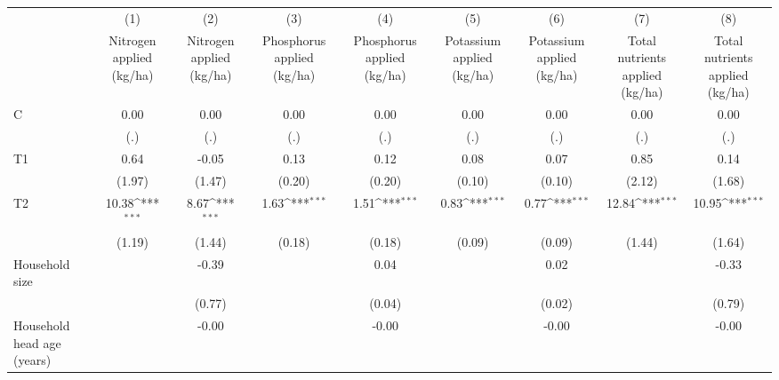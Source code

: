 {
\def\sym#1{\ifmmode^{#1}\else\(^{#1}\)\fi}
\begin{tabular}{l*{8}{c}}
\hline\hline
                &\multicolumn{1}{c}{(1)}&\multicolumn{1}{c}{(2)}&\multicolumn{1}{c}{(3)}&\multicolumn{1}{c}{(4)}&\multicolumn{1}{c}{(5)}&\multicolumn{1}{c}{(6)}&\multicolumn{1}{c}{(7)}&\multicolumn{1}{c}{(8)}\\
                &\multicolumn{1}{c}{Nitrogen applied (kg/ha)}&\multicolumn{1}{c}{Nitrogen applied (kg/ha)}&\multicolumn{1}{c}{Phosphorus applied (kg/ha)}&\multicolumn{1}{c}{Phosphorus applied (kg/ha)}&\multicolumn{1}{c}{Potassium applied (kg/ha)}&\multicolumn{1}{c}{Potassium applied (kg/ha)}&\multicolumn{1}{c}{Total nutrients applied (kg/ha)}&\multicolumn{1}{c}{Total nutrients applied (kg/ha)}\\
\hline
C               &     0.00         &     0.00         &     0.00         &     0.00         &     0.00         &     0.00         &     0.00         &     0.00         \\
                &      (.)         &      (.)         &      (.)         &      (.)         &      (.)         &      (.)         &      (.)         &      (.)         \\
T1              &     0.64         &    -0.05         &     0.13         &     0.12         &     0.08         &     0.07         &     0.85         &     0.14         \\
                &   (1.97)         &   (1.47)         &   (0.20)         &   (0.20)         &   (0.10)         &   (0.10)         &   (2.12)         &   (1.68)         \\
T2              &    10.38\sym{***}&     8.67\sym{***}&     1.63\sym{***}&     1.51\sym{***}&     0.83\sym{***}&     0.77\sym{***}&    12.84\sym{***}&    10.95\sym{***}\\
                &   (1.19)         &   (1.44)         &   (0.18)         &   (0.18)         &   (0.09)         &   (0.09)         &   (1.44)         &   (1.64)         \\
Household size  &                  &    -0.39         &                  &     0.04         &                  &     0.02         &                  &    -0.33         \\
                &                  &   (0.77)         &                  &   (0.04)         &                  &   (0.02)         &                  &   (0.79)         \\
Household head age (years)&                  &    -0.00         &                  &    -0.00         &                  &    -0.00         &                  &    -0.00         \\

\end{tabular}}
